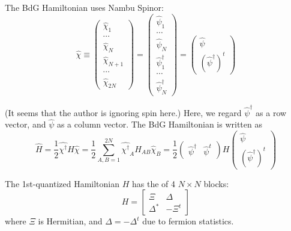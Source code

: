 \documentclass{article}
\begin{document}
The BdG Hamiltonian uses Nambu Spinor:
\begin{equation}
    \hat\chi \equiv \begin{pmatrix}
        \hat\chi_1 \\ \cdots \\ \hat\chi_N \\ 
        \hat\chi_{N+1} \\ \cdots \\ \hat\chi_{2N}
    \end{pmatrix}
    =
    \begin{pmatrix}
        \hat\psi_1 \\ \cdots \\ \hat\psi_N \\
        \hat\psi^\dagger_1 \\ \cdots \\ \hat\psi^\dagger_N
    \end{pmatrix}
    =
    \begin{pmatrix}
        \hat\psi \\ (\hat\psi^\dagger)^t
    \end{pmatrix}
\end{equation}

(It seems that the author is ignoring spin here.)
Here, we regard $\hat\psi^\dagger$ as a row vector, and $\hat\psi$ as
a column vector. The BdG Hamiltonian is written as
\begin{equation}
    \label{eq:super-H}
    \hat{H} =
    \frac{1}{2} \hat{\chi^\dagger} H \hat{\chi} 
    =
    \frac{1}{2} \sum_{A,B=1}^{2N} \hat{\chi^\dagger}_A H_{AB} \hat\chi_B
    = \frac{1}{2} \begin{pmatrix}
        \hat\psi^\dagger & \hat\psi^t
    \end{pmatrix} H 
    \begin{pmatrix}
        \hat\psi \\ (\hat\psi^\dagger)^t
    \end{pmatrix}
\end{equation}

The 1st-quantized Hamiltonian $H$ has the of 4 $N\times N$ blocks:
\begin{equation}
    \label{eq:super-H-def}
    H =
    \begin{bmatrix}
        \Xi & \Delta \\
        \Delta^* & -\Xi^t
    \end{bmatrix}
\end{equation}
where $\Xi$ is Hermitian, and $\Delta=-\Delta^t$ due to fermion
statistics. 
\end{document}
